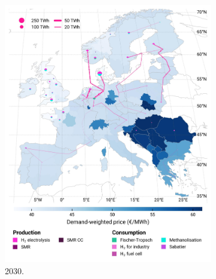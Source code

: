 \documentclass[preprint,12pt,sort&compress]{elsarticle}
\begin{document}
\clearpage
\begin{figure}[htbp]
  \centering
  \begin{subfigure}[t]{0.4\textwidth}
      \vspace{0pt}
      \includegraphics[width=1\textwidth,trim=0cm 2.8cm 0cm 0cm, clip]{maps/pcipmi/base_s_adm___2030-balance_map_H2}
      \vspace{-0.5cm}
      \caption{ 2030.}
      \label{fig:PCI_lt_2030_h2}
  \end{subfigure}
  \hfill
  \begin{subfigure}[t]{0.4\textwidth}
      \vspace{0pt}

\end{subfigure}
\end{figure}
\end{document}
